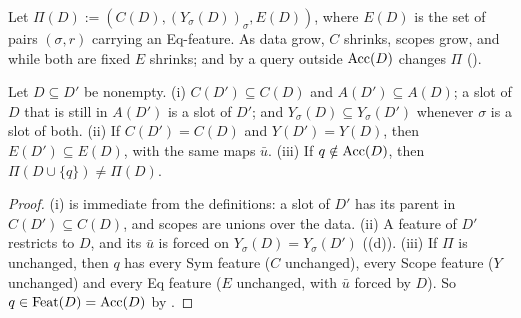 Let $\Pi(D):=(C(D),(Y_\sigma(D))_\sigma,E(D))$, where $E(D)$ is the set of pairs $(\sigma,r)$ carrying an Eq-feature. As data grow, $C$ shrinks, scopes grow, and while both are fixed $E$ shrinks; and by  a query outside $\mathrm{Acc}(D)$ changes $\Pi$ ().

\begin{lemma}[Monotonicity]\label{lem:single:monotone}
Let $D\subseteq D'$ be nonempty.
(i) $C(D')\subseteq C(D)$ and $A(D')\subseteq A(D)$; a slot of $D$ that is still in $A(D')$ is a slot of $D'$; and $Y_\sigma(D)\subseteq Y_\sigma(D')$ whenever $\sigma$ is a slot of both.
(ii) If $C(D')=C(D)$ and $Y(D')=Y(D)$, then $E(D')\subseteq E(D)$, with the same maps $\bar u$.
(iii) If $q\notin\mathrm{Acc}(D)$, then $\Pi(D\cup\{q\})\neq\Pi(D)$.
\end{lemma}

\begin{proof}
(i) is immediate from the definitions: a slot of $D'$ has its parent in $C(D')\subseteq C(D)$, and scopes are unions over the data. (ii) A feature of $D'$ restricts to $D$, and its $\bar u$ is forced on $Y_\sigma(D)=Y_\sigma(D')$ ((d)). (iii) If $\Pi$ is unchanged, then $q$ has every Sym feature ($C$ unchanged), every Scope feature ($Y$ unchanged) and every Eq feature ($E$ unchanged, with $\bar u$ forced by $D$). So $q\in\mathrm{Feat}(D)=\mathrm{Acc}(D)$ by .
\end{proof}


